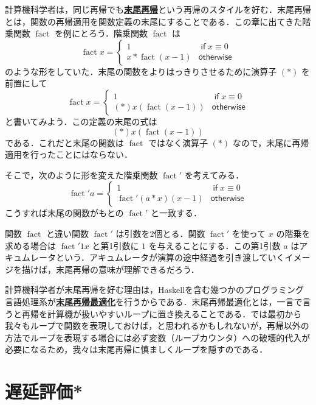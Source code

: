 \documentclass[a4paper,twocolumn]{jsbook}
\newcommand{\programminglanguage}[1]{\textsf{#1}}
\newcommand{\haskell}{\programminglanguage{Haskell}}
\newcommand{\keyword}[1]{{\underline{\textbf{#1}}}}
\newcommand{\mKeyword}[1]{\mathsf{#1}} %
\newcommand{\mIfKeyword}{\mKeyword{if}}
\newcommand{\mOtherwiseKeyword}{\mKeyword{otherwise}}
\DeclareMathOperator{\mIf}{\mIfKeyword}
\DeclareMathOperator{\mOtherwise}{\mOtherwiseKeyword}
\newcommand{\mSpecialFunc}[1]{\mathrm{#1}}
\DeclareMathOperator{\mFact}{\mSpecialFunc{fact}}
\begin{document}
計算機科学者は，同じ再帰でも\keyword{末尾再帰}という再帰のスタイルを好む．末尾再帰とは，関数の再帰適用を関数定義の末尾にすることである．この章に出てきた階乗関数 $\mFact$ を例にとろう．階乗関数 $\mFact$ は
\begin{equation}
\mFact x=\begin{cases}
1&\mIf x\equiv0\\
x*\mFact(x-1)&\mOtherwise
\end{cases}
\end{equation}
のような形をしていた．末尾の関数をよりはっきりさせるために演算子 $(*)$ を前置にして
\begin{equation}
\mFact x=\begin{cases}
1&\mIf x\equiv0\\
(*)x(\mFact(x-1))&\mOtherwise
\end{cases}
\end{equation}
と書いてみよう．この定義の末尾の式は
\begin{equation}
(*)x(\mFact(x-1))
\end{equation}
である．これだと末尾の関数は $\mFact$ ではなく演算子 $(*)$ なので，末尾に再帰適用を行ったことにはならない．

そこで，次のように形を変えた階乗関数 $\mFact'$ を考えてみる．
\begin{equation}
\mFact' a=\begin{cases}
1&\mIf x\equiv0\\
\mFact'(a*x)(x-1)&\mOtherwise
\end{cases}
\end{equation}
こうすれば末尾の関数がもとの $\mFact'$ と一致する．

関数 $\mFact$ と違い関数 $\mFact'$ は引数を2個とる．関数 $\mFact'$ を使って $x$ の階乗を求める場合は $\mFact'1x$ と第1引数に $1$ を与えることにする．この第1引数 $a$ はアキュムレータという．アキュムレータが演算の途中経過を引き渡していくイメージを描けば，末尾再帰の意味が理解できるだろう．

計算機科学者が末尾再帰を好む理由は，\haskell を含む幾つかのプログラミング言語処理系が\keyword{末尾再帰最適化}を行うからである．末尾再帰最適化とは，一言で言うと再帰を計算機が扱いやすいループに置き換えることである．では最初から我々もループで関数を表現しておけば，と思われるかもしれないが，再帰以外の方法でループを表現する場合には必ず変数（ループカウンタ）への破壊的代入が必要になるため，我々は末尾再帰に慎ましくループを隠すのである．

\section{遅延評価*}
\end{document}
